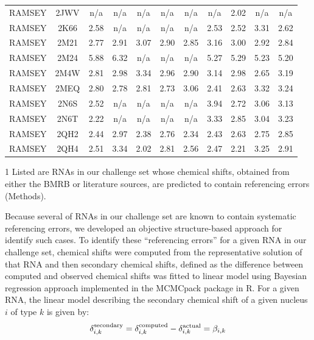 \documentclass[journal=jcisd8,manuscript=article,layout=onecolumn]{achemso}
\begin{document}
\begin{table}[h!]
\begin{threeparttable}
\begin{tabular}{c c c c c c c c c c c}
RAMSEY  & 2JWV & n/a & n/a & n/a & n/a & n/a & n/a & 2.02 & n/a & n/a \\
RAMSEY  & 2K66 & 2.58 & n/a & n/a & n/a & n/a & 2.53 & 2.52 & 3.31 & 2.62 \\
RAMSEY  & 2M21 & 2.77 & 2.91 & 3.07 & 2.90 & 2.85 & 3.16 & 3.00 & 2.92 & 2.84 \\
RAMSEY  & 2M24 & 5.88 & 6.32 & n/a & n/a & n/a & 5.27 & 5.29 & 5.23 & 5.20 \\
RAMSEY  & 2M4W & 2.81 & 2.98 & 3.34 & 2.96 & 2.90 & 3.14 & 2.98 & 2.65 & 3.19 \\
RAMSEY  & 2MEQ & 2.80 & 2.78 & 2.81 & 2.73 & 3.06 & 2.41 & 2.63 & 3.32 & 3.24 \\
RAMSEY  & 2N6S & 2.52 & n/a & n/a & n/a & n/a & 3.94 & 2.72 & 3.06 & 3.13 \\
RAMSEY  & 2N6T & 2.22 & n/a & n/a & n/a & n/a & 3.33 & 2.85 & 3.04 & 3.23 \\
RAMSEY  & 2QH2 & 2.44 & 2.97 & 2.38 & 2.76 & 2.34 & 2.43 & 2.63 & 2.75 & 2.85 \\
RAMSEY  & 2QH4 & 2.51 & 3.34 & 2.02 & 2.81 & 2.56 & 2.47 & 2.21 & 3.25 & 2.91 \\

\hline
\end{tabular}
\begin{tablenotes}
\item[1] Listed are RNAs in our challenge set whose chemical shifts, obtained from either the BMRB or literature sources, are predicted to contain referencing errors (Methods).
\end{tablenotes}
\end{threeparttable}
\label{tab:referrors} 
\end{table}
Because several of RNAs in our challenge set are known to contain systematic referencing errors\cite{aeschbacher2012procedure}, we developed an objective structure-based approach for identify such cases. To identify these ``referencing errors'' for a given RNA in our challenge set, chemical shifts were computed from the representative solution of that  RNA and then secondary chemical shifts, defined as the difference between computed and  observed chemical shifts was fitted to linear model using Bayesian regression approach implemented in the MCMCpack package in R\cite{martin2011mcmcpack}. For a given RNA, the linear model describing the secondary chemical shift of a given nucleus $i$ of type $k$ is given by:
\begin{equation}\label{eq:wmae} 
\delta^{\rm secondary}_{i, k} =  \delta^{\rm computed}_{i, k} - \delta^{\rm actual}_{i, k} = \beta_{i, k}
\end{equation}
\end{document}
